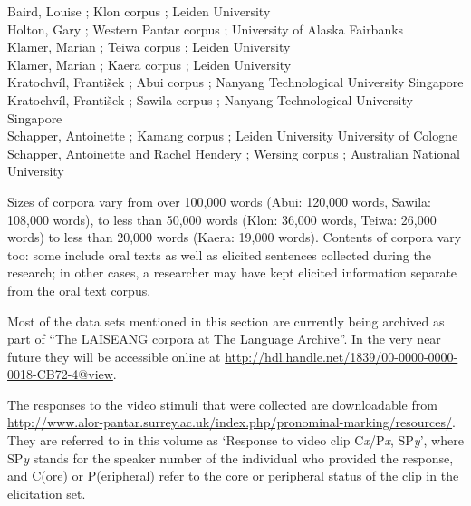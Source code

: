Baird, Louise ; Klon corpus ; Leiden University\\
Holton, Gary ;  Western Pantar corpus ; University of Alaska Fairbanks\\ 
Klamer, Marian ; Teiwa corpus ; Leiden University\\
Klamer, Marian ;  Kaera corpus ; Leiden University\\
Kratochv\'il, Franti\v{s}ek ;  Abui corpus ; Nanyang Technological University Singapore\\ 
Kratochv\'il, Franti\v{s}ek ;  Sawila corpus ; Nanyang Technological University Singapore\footnotemark{} \\
Schapper, Antoinette ; Kamang corpus ; Leiden University  University\- of Cologne\\
Schapper, Antoinette and Rachel Hendery ; Wersing corpus ; Australian National  University\-\\ 


Sizes of corpora vary from over 100,000 words (Abui: 120,000 words, Sawila: 108,000 words), to less than 50,000 words (Klon: 36,000 words, Teiwa: 26,000 words) to less than 20,000 words (Kaera: 19,000 words). Contents of corpora vary too: some include oral texts as well as elicited sentences collected during the research; in other cases, a researcher may have kept elicited information separate from the oral text corpus.

Most of the data sets mentioned in this section are currently being archived as part of ``The LAISEANG corpora at The Language Archive''. In the very near future they will be accessible online at \href{https://webmail.campus.leidenuniv.nl/owa/redir.aspx?C=VcF3tDaLq0iIlRczzT0ZXw_xD4uU3tAIZUYVDzSuO7QzFpu5wi759CTWognlXJNmDHNv_KzsnWc. & URL=http://hdl.handle.net/1839/00-0000-0000-0018-CB72-4@view}{http://hdl.handle.net/1839/00-0000-0000-0018-CB72-4@view}.

The responses to the video stimuli that were collected are downloadable from \url{http://www.alor-pantar.surrey.ac.uk/index.php/pronominal-marking/resources/}. They are referred to in this volume as `Response to video clip C\textit{x}/P\textit{x}, SP\textit{y}', where SP\textit{y} stands for the speaker number of the individual who provided the response, and C(ore) or P(eripheral) refer to the core or peripheral status of the clip in the elicitation set. 

